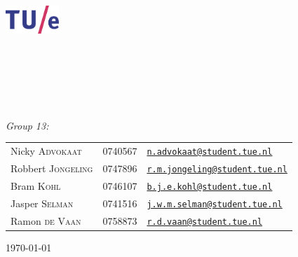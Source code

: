 \begin{titlepage}
	\begin{center}

		\includegraphics[width=0.15\textwidth]{images/tuelogo}\\[1cm]

		\textsc{\LARGE \uni}\\[0.2cm]

		\textsc{\fase}\\[1.6cm]

        \textsc{\LARGE \vak}\\[0.5cm]

\HRule \\[0.4cm]
{ \huge \bfseries \essaytitle}\\[0.4cm]

\HRule \\[1.5cm]

	\emph{Group 13:}\\
    \begin{tabular}{l l l}
	Nicky \textsc{Advokaat} & 0740567 & \href{mailto:n.advokaat@student.tue.nl}{\texttt{n.advokaat@student.tue.nl}}\\
	Robbert \textsc{Jongeling} & 0747896 & \href{mailto:r.m.jongeling@student.tue.nl}{\texttt{r.m.jongeling@student.tue.nl}}\\
	Bram \textsc{Kohl} & 0746107 & \href{mailto:b.j.e.kohl@student.tue.nl}{\texttt{b.j.e.kohl@student.tue.nl}}\\
	Jasper \textsc{Selman} & 0741516 & \href{mailto:j.w.m.selman@student.tue.nl}{\texttt{j.w.m.selman@student.tue.nl}}\\
	Ramon \textsc{de Vaan} & 0758873 & \href{mailto:r.d.vaan@student.tue.nl}{\texttt{r.d.vaan@student.tue.nl}}
    \end{tabular}
		\vfill

		{\large \today} \\
		\stad

	\end{center}
\end{titlepage}